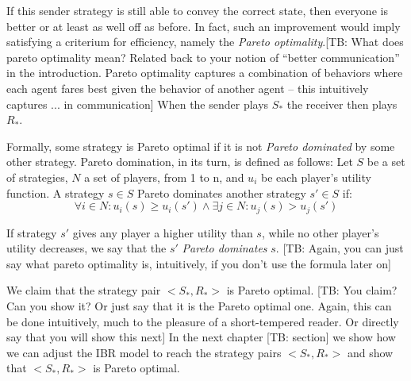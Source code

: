 \documentclass[10pt]{article}
\newcommand{\tb}[1]{\textcolor[rgb]{.8,.33,.0}{[TB: #1]}}%
\begin{document}
If this sender strategy is still able to convey the correct state, then everyone is better or at least as well off as before. In fact, such an improvement would imply satisfying a criterium for efficiency, namely the  \textit{Pareto optimality}.\tb{What does pareto optimality mean? Related back to your notion of ``better communication'' in the introduction. Pareto optimality captures a combination of behaviors where each agent fares best given the behavior of another agent -- this intuitively captures ... in communication} When the sender plays $S_*$ the receiver then plays $R_*$.

Formally, some strategy is Pareto optimal if it is not \textit{Pareto dominated} by some other strategy. Pareto domination, in its turn, is defined as follows:
Let $S$ be a set of strategies, $N$ a set of players, from 1 to n, and $u_i$ be each player's utility function. A strategy $s \in S$ Pareto dominates another strategy $s' \in S$ if:
\begin{equation*}
\forall i \in N: u_i(s) \geq u_i(s') \land \exists j \in N: u_j(s) > u_j(s')
\end{equation*}

If strategy $s'$ gives any player a higher utility than $s$, while no other player's utility decreases, we say that the $s'$ \textit{Pareto dominates} $s$. \tb{Again, you can just say what pareto optimality is, intuitively, if you don't use the formula later on}

We claim that the strategy pair $<S_*,R_*>$ is Pareto optimal. \tb{You claim? Can you show it? Or just say that it is the Pareto optimal one. Again, this can be done intuitively, much to the pleasure of a short-tempered reader. Or directly say that you will show this next} In the next chapter  \tb{section} we show how we can adjust the IBR model to reach the strategy pairs $<S_*,R_*>$ and show that $<S_*,R_*>$ is Pareto optimal.
\end{document}
